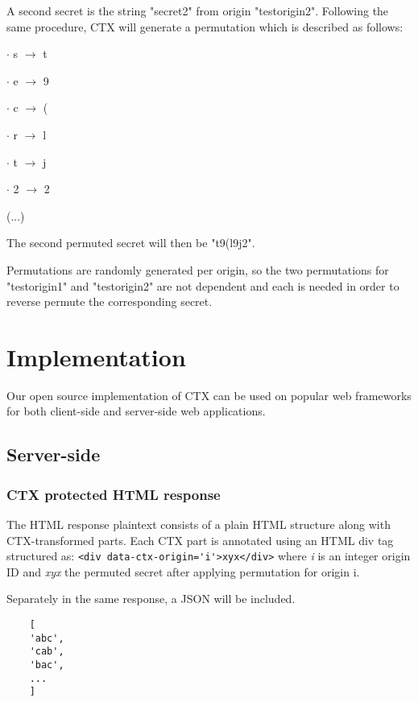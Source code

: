 \documentclass[a4paper, 11 pt, conference]{article}  %
\begin{document}
A second secret is the string "secret2" from origin "testorigin2". Following the
same procedure, CTX will generate a permutation which is described as follows:

\begin{description}
    \item{$\cdot$ s} $\rightarrow$ t
    \item{$\cdot$ e} $\rightarrow$ 9
    \item{$\cdot$ c} $\rightarrow$ (
    \item{$\cdot$ r} $\rightarrow$ l
    \item{$\cdot$ t} $\rightarrow$ j
    \item{$\cdot$ 2} $\rightarrow$ 2
    \item (...)
\end{description}

The second permuted secret will then be "t9(l9j2".

Permutations are randomly generated per origin, so the two permutations for
"testorigin1" and "testorigin2" are not dependent and each is needed in order to
reverse permute the corresponding secret.

\section{Implementation}

Our open source implementation of CTX can be used on popular web frameworks for both client-side and server-side web applications.

\subsection{Server-side}

\subsubsection{CTX protected HTML response}
The HTML response plaintext consists of a plain HTML structure along with CTX-transformed parts. Each CTX part is annotated using an HTML div tag structured as:
\lstinline{<div data-ctx-origin='i'>xyx</div>}
where \textit{i} is an integer origin ID and \textit{xyx} the permuted secret after applying permutation for origin i.

Separately in the same response, a JSON will be included.

\begin{lstlisting}
    [
    'abc',
    'cab',
    'bac',
    ...
    ]
\end{lstlisting}
\end{document}
